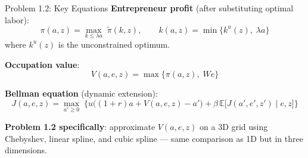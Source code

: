 \documentclass[aspectratio=169,11pt]{beamer}
\newcommand{\E}{\mathbb{E}}
\begin{document}
\begin{frame}{Problem 1.2: Key Equations}
    \textbf{Entrepreneur profit} (after substituting optimal labor):
    \[
    \pi(a,z) = \max_{k \le \lambda a}\; \tilde\pi(k,z),
    \qquad
    k(a,z) = \min\{k^u(z),\; \lambda a\}
    \]
    where $k^u(z)$ is the unconstrained optimum.
    \vspace{0.4em}

    \textbf{Occupation value}:
    \[
    V(a,e,z) = \max\bigl\{\pi(a,z),\; We\bigr\}
    \]
    \vspace{0.2em}

    \textbf{Bellman equation} (dynamic extension):
    \[
    \boxed{
    J(a,e,z) = \max_{a'\ge 0}\;\bigl\{u\bigl((1+r)a + V(a,e,z) - a'\bigr) + \beta\,\E\bigl[J(a',e',z')\mid e,z\bigr]\bigr\}
    }
    \]
    \vspace{0.2em}

    \textbf{Problem 1.2 specifically}: approximate $V(a,e,z)$ on a 3D grid using Chebyshev, linear spline, and cubic spline --- same comparison as 1D but in three dimensions.
\end{frame}
\end{document}
